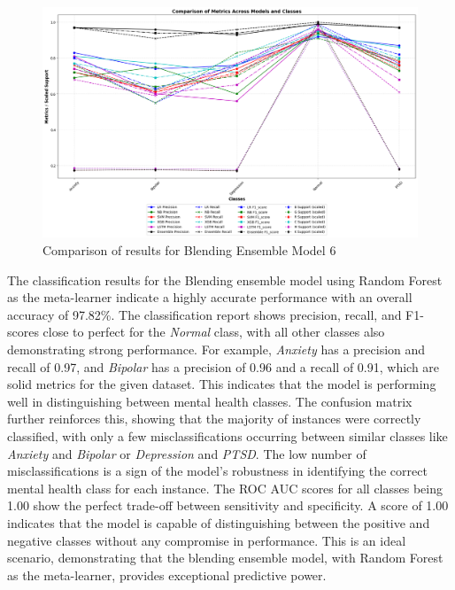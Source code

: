 \begin{figure}[h!]  
    \centering
    \includegraphics[width=1.0\textwidth]{Images/BLD RESULT.png}  
    \caption{Comparison of results for Blending Ensemble Model 6}
    \label{dfdl1244883}  %
\end{figure}

\noindent
The classification results for the Blending ensemble model using Random Forest as the meta-learner indicate a highly accurate performance with an overall accuracy of 97.82\%. The classification report shows precision, recall, and F1-scores close to perfect for the \textit{Normal} class, with all other classes also demonstrating strong performance. For example, \textit{Anxiety} has a precision and recall of 0.97, and \textit{Bipolar} has a precision of 0.96 and a recall of 0.91, which are solid metrics for the given dataset. This indicates that the model is performing well in distinguishing between mental health classes. The confusion matrix further reinforces this, showing that the majority of instances were correctly classified, with only a few misclassifications occurring between similar classes like \textit{Anxiety} and \textit{Bipolar} or \textit{Depression} and \textit{PTSD}. The low number of misclassifications is a sign of the model’s robustness in identifying the correct mental health class for each instance. The ROC AUC scores for all classes being 1.00 show the perfect trade-off between sensitivity and specificity. A score of 1.00 indicates that the model is capable of distinguishing between the positive and negative classes without any compromise in performance. This is an ideal scenario, demonstrating that the blending ensemble model, with Random Forest as the meta-learner, provides exceptional predictive power.

